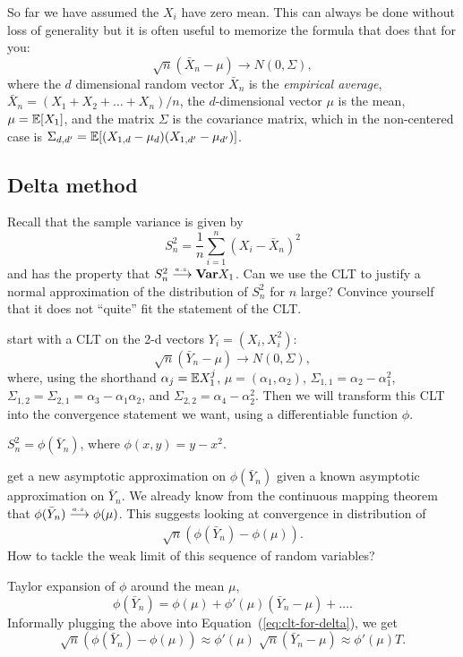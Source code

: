 \documentclass{article}
\begin{document}
So far we have assumed the $X_i$ have zero mean. This can always be done without loss of generality but it is often useful to memorize the formula that does that for you:
\[ \sqrt{n}(\bar X_n - \mu) \to N(0, \Sigma), \]
where the $d$ dimensional random vector $\bar X_n$ is the \emph{empirical average}, $\bar X_n = (X_1 + X_2 + \dots + X_n) /n$, the $d$-dimensional vector $\mu$ is the mean, $\mu = {\mathbb E}[X_1]$, and the matrix $\Sigma$ is the covariance matrix, which in the non-centered case is $\Sigma_{d,d'} = {\mathbb E}[ (X_{1,d} - \mu_d) (X_{1,d'} - \mu_{d'}) ]$.


\subsection{Delta method}

 Recall that the sample variance is given by
\[ S_n^2 = \frac{1}{n} \sum_{i=1}^n (X_i - \bar X_n)^2 \]
and has the property that $S_n^2 \stackrel{\scriptscriptstyle a.s.}{\longrightarrow} {\text {\bf Var}} X_1$. Can we use the CLT to justify a normal approximation of the distribution of $S_n^2$ for $n$ large? Convince yourself that it does not ``quite'' fit the statement of the CLT.

 start with a CLT on the 2-d vectors $Y_i = (X_i, X_i^2)$:
\[ \sqrt{n}(\bar Y_n - \mu) \to N(0, \Sigma), \]
where, using the shorthand $\alpha_j = {\mathbb E} X_1^j$, $\mu = (\alpha_1, \alpha_2)$, $\Sigma_{1,1} = \alpha_2 - \alpha_1^2$, $\Sigma_{1,2} = \Sigma_{2,1} = \alpha_3 - \alpha_1 \alpha_2$, and  $\Sigma_{2,2} = \alpha_4 - \alpha_2^2$. Then we will transform this CLT into the convergence statement we want, using a differentiable function $\phi$. 

 $S_n^2 = \phi(\bar Y_n)$, where $\phi(x, y) = y - x^2$. 

 get a new asymptotic approximation on $\phi(\bar Y_n)$ given a known asymptotic approximation on $\bar Y_n$. We already know from the continuous mapping theorem that $\phi(\bar Y_n) \stackrel{\scriptscriptstyle a.s.}{\longrightarrow} \phi(\mu)$. This suggests looking at convergence in distribution of 
\begin{align}\label{eq:clt-for-delta}
\sqrt{n}(\phi(\bar Y_n) - \phi(\mu)).
\end{align}
How to tackle the weak limit of this sequence of random variables?

 Taylor expansion of $\phi$ around the mean $\mu$, 
\[\phi(\bar Y_n) = \phi(\mu) + \phi'(\mu)(\bar Y_n - \mu) + \dots.\]
Informally plugging the above into Equation~(\ref{eq:clt-for-delta}), we get
\[ \sqrt{n}(\phi(\bar Y_n) - \phi(\mu)) \approx \phi'(\mu) \; \sqrt{n} (\bar Y_n - \mu) \approx \phi'(\mu) T. \]
\end{document}
